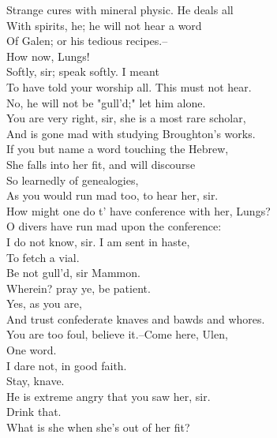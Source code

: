 \documentclass{memoir}
\begin{document}
\begin{drama*}
 Strange cures with mineral physic. He deals all\\
 With spirits, he; he will not hear a word\\
 Of Galen; or his tedious recipes.--\\
 How now, Lungs!\\
\facespeaks {} Softly, sir; speak softly. I meant\\
 To have told your worship all. This must not hear.\\
\mammonspeaks  No, he will not be "gull'd;" let him alone.\\
\facespeaks  You are very right, sir, she is a most rare scholar,\\
 And is gone mad with studying Broughton's works.\\
 If you but name a word touching the Hebrew,\\
 She falls into her fit, and will discourse\\
 So learnedly of genealogies,\\
 As you would run mad too, to hear her, sir.\\
\mammonspeaks  How might one do t' have conference with her, Lungs?\\
\facespeaks  O divers have run mad upon the conference:\\
 I do not know, sir. I am sent in haste,\\
 To fetch a vial.\\
\surlyspeaks {} Be not gull'd, sir Mammon.\\
\mammonspeaks  Wherein? pray ye, be patient.\\
\surlyspeaks {} Yes, as you are,\\
 And trust confederate knaves and bawds and whores.\\
\mammonspeaks  You are too foul, believe it.--Come here, Ulen,\\
 One word.\\
\facespeaks {} I dare not, in good faith.\\
\mammonspeaks {} Stay, knave.\\
\facespeaks  He is extreme angry that you saw her, sir.\\
\mammonspeaks  Drink that.\\
 What is she when she's out of her fit?\\

\end{drama*}
\end{document}
